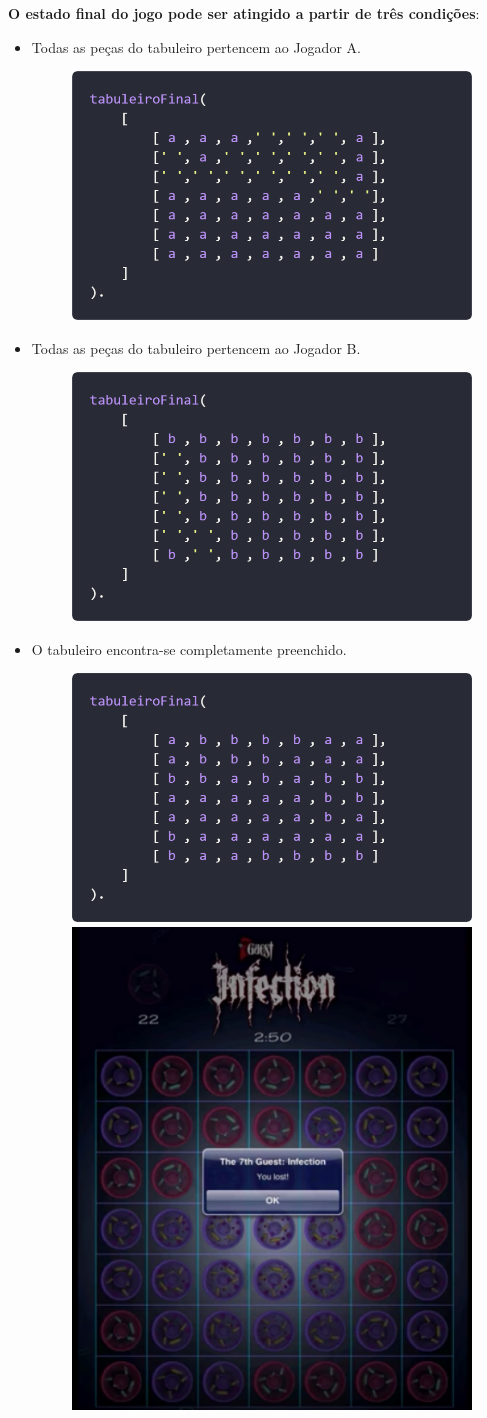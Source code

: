 \documentclass[a4paper]{article}
\begin{document}
\newpage
\textbf{O estado final do jogo pode ser atingido a partir de três condições}:

\begin{itemize}
    \item Todas as peças do tabuleiro pertencem ao Jogador A.
    \begin{figure}[hbp!]
        \centering
        \includegraphics[width=.6\linewidth]{prints/game-tab-final-1.png}
    \end{figure}
    \item Todas as peças do tabuleiro pertencem ao Jogador B.
    \begin{figure}[hbp!]
        \centering
        \includegraphics[width=.6\linewidth]{prints/game-tab-final-2.png}
    \end{figure}
    \item O tabuleiro encontra-se completamente preenchido.
    \begin{figure}[hbp!]
        \centering
        \includegraphics[width=.5945\linewidth]{prints/game-tab-final-3.png}
        \includegraphics[width=.3055\linewidth]{others/game-tab-final.png}
    \end{figure}
\end{itemize}
\end{document}
